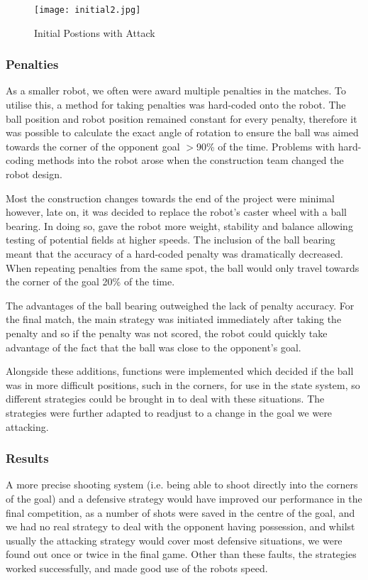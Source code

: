 \begin{figure}[htp]
\begin{center}
\leavevmode
\texttt{[image: initial2.jpg]}
\end{center}
\caption{Initial Postions with Attack}
\label{fig:initial2}
\end{figure}

\subsubsection{Penalties}
As a smaller robot, we often were award multiple penalties in the matches. To utilise this, a method for taking penalties was hard-coded onto the robot. The ball position and robot position remained constant for every penalty, therefore it was possible to calculate the exact angle of rotation to ensure the ball was aimed towards the corner of the opponent goal $>$90\% of the time. Problems with hard-coding methods into the robot arose when the construction team changed the robot design. \linebreak

Most the construction changes towards the end of the project were minimal however, late on, it was decided to replace the robot's caster wheel with a ball bearing. In doing so, gave the robot more weight, stability and balance allowing testing of potential fields at higher speeds. The inclusion of the ball bearing meant that the accuracy of a hard-coded penalty was dramatically decreased. When repeating penalties from the same spot, the ball would only travel towards the corner of the goal 20\% of the time.

The advantages of the ball bearing outweighed the lack of penalty accuracy. For the final match, the main strategy was initiated immediately after taking the penalty and so if the penalty was not scored, the robot could quickly take advantage of the fact that the ball was close to the opponent's goal.\linebreak

Alongside these additions, functions were implemented which decided if the ball was in more difficult positions, such in the corners, for use in the state system, so different strategies could be brought in to deal with these situations. The strategies were further adapted to readjust to a change in the goal we were attacking. \linebreak

\subsubsection{Results}
A more precise shooting system (i.e. being able to shoot directly into the corners of the goal) and a defensive strategy would have improved our performance in the final competition, as a number of shots were saved in the centre of the goal, and we had no real strategy to deal with the opponent having possession, and whilst usually the attacking strategy would cover most defensive situations, we were found out once or twice in the final game. Other than these faults, the strategies worked successfully, and made good use of the robots speed.

